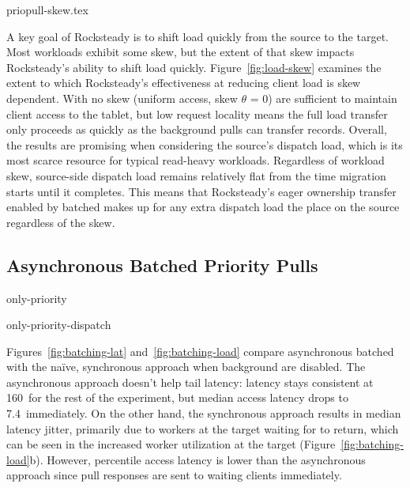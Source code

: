 

%

 {priopull-skew.tex}

A key goal of Rocksteady is to shift load quickly from the source to the
target. Most workloads exhibit some skew, but the extent of that skew impacts
Rocksteady's ability to shift load quickly. Figure~\ref{fig:load-skew}
examines the extent to which Rocksteady's effectiveness at reducing client load
is skew dependent. With no skew (uniform access, skew $\theta$ = 0) \priopulls are
sufficient to maintain client access to the tablet, but low request locality
means the full load transfer only proceeds as quickly as the background pulls
can transfer records.  Overall, the results are promising when considering the
source's dispatch load, which is its most scarce resource for typical
read-heavy workloads. Regardless of workload skew, source-side dispatch load
remains relatively flat from the time migration starts until it completes.
This means that  Rocksteady's eager ownership transfer enabled by
batched \priopulls makes up for any extra dispatch load the \pulls place
on the source regardless of the skew.


\subsection{Asynchronous Batched Priority Pulls}
\label{sec:eval-priopulls}

 {only-priority}

 {only-priority-dispatch}

Figures~\ref{fig:batching-lat} and~\ref{fig:batching-load} compare
asynchronous batched \priopulls with the na\"{i}ve, synchronous approach
when background \pulls are disabled. The asynchronous
approach doesn't help tail latency:
\nnnth latency stays consistent at 160~\us for the rest of the
experiment, but median access latency drops to 7.4~\us immediately.
On the other hand, the synchronous approach results in
median latency jitter,
primarily due to workers at the target waiting for \priopulls to return, which
can be seen in the increased worker utilization at the target
(Figure~\ref{fig:batching-load}b).  However, \nnnth percentile access latency
is lower than the asynchronous approach since pull responses are sent to
waiting clients immediately.

